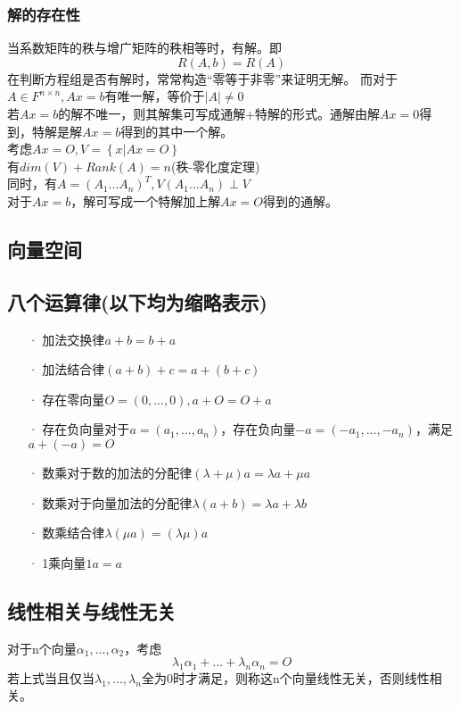 \documentclass[UTF8]{ctexart}
\begin{document}
	\subsubsection{解的存在性}
	当系数矩阵的秩与增广矩阵的秩相等时，有解。即
	\[\displaystyle R(A,b)=R(A) \]
	在判断方程组是否有解时，常常构造“零等于非零”来证明无解。
	\indent
	而对于$A\in F^{n\times n},Ax=b$有唯一解，等价于$|A|\neq 0$\\
	\indent
	若$Ax=b$的解不唯一，则其解集可写成通解+特解的形式。通解由解$Ax=\mathit{0}$得到，特解是解$Ax=b$得到的其中一个解。\\
	\indent
	考虑$Ax=\mathit{O},V=\left\{{x|Ax=\mathit{O}}\right\}$\\
	\indent
	有$dim(V)+Rank(A)=n$(秩-零化度定理)\\
	\indent
	同时，有$A=(A_1...A_n)^T,V(A_1...A_n)\perp V$\\
	\indent
	对于$Ax=b$，解可写成一个特解加上解$Ax=\mathit{O}$得到的通解。
	\subsection{向量空间}
	\subsection{八个运算律(以下均为缩略表示)}
	\begin{itemize}
		\item [·]加法交换律$a+b=b+a$
		\item [·]加法结合律$(a+b)+c=a+(b+c)$
		\item [·]存在零向量$\mathit{O}=(0,...,0),a+\mathit{O}=\mathit{O}+a$
		\item [·]存在负向量对于$a=(a_1,...,a_n)$，存在负向量$-a=(-a_1,...,-a_n)$，满足$a+(-a)=\mathit{O}$
		\item [·]数乘对于数的加法的分配律$(\lambda+\mu)a=\lambda a+\mu a$
		\item [·]数乘对于向量加法的分配律$\lambda(a+b)=\lambda a+\lambda b$
		\item [·]数乘结合律$\lambda(\mu a)=(\lambda \mu)a$
		\item [·]1乘向量$1a=a$
	\end{itemize}
	\subsection{线性相关与线性无关}
	对于n个向量$\alpha_1,...,\alpha_2$，考虑
	\[\displaystyle \lambda_1\alpha_1+...+\lambda_n\alpha_n=\mathit{O}\]
	\indent
	若上式当且仅当$\lambda_1,...,\lambda_n$全为0时才满足，则称这n个向量线性无关，否则线性相关。
\end{document}
